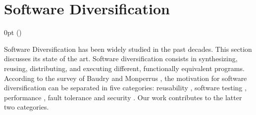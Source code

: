 \section{Software Diversification}
\label{sota:sota}
\def\checkmark{\tikz\fill[scale=0.4](0,.35) -- (.25,0) -- (1,.7) -- (.25,.15) -- cycle;} 

  {\topsep}%
  {\topsep}%
  {\itshape}%
  {0pt}%
  {\bfseries}%
  {}%
  { }%
  {()\textnormal{}}

\def\Gnospace~{G{}}
\theoremstyle{sota}
\newtheorem{goal}{G}
\providecommand*{\definitionautorefname}{\Gnospace}
\newcommand{\goalautorefname}{\Gnospace}


\def\Snospace~{S{}}
\theoremstyle{sota}
\newtheorem{strategy}{S}
\providecommand*{\definitionautorefname}{\Snospace}
\newcommand{\strategyautorefname}{\Snospace}

\def\Unospace~{U{}}
\theoremstyle{sota}
\newtheorem{usage}{U}
\providecommand*{\definitionautorefname}{\Unospace}
\newcommand{\usageautorefname}{\Unospace}









Software Diversification has been widely studied in the past decades. This section discusses its state of the art.
Software diversification consists in synthesizing, reusing, distributing, and executing different, functionally equivalent programs. 
According to the survey of Baudry and Monperrus \cite{natural_diversity}, the motivation for software diversification can be separated in five categories: reusability \cite{pohl2005software}, software testing \cite{Chen2010AdaptiveRT}, performance \cite{10.1145/2025113.2025133}, fault tolerance \cite{1659219} and security \cite{cohen1993operating}. Our work contributes to the latter two categories. 

